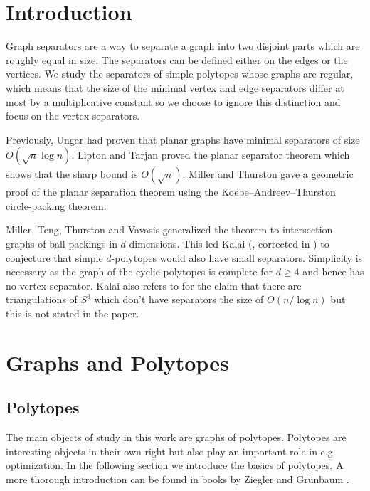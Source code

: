 \chapter{Introduction}
\label{intro}

Graph separators are a way to separate a graph into two disjoint parts which 
are roughly equal in size. The separators can be defined either on the edges or 
the vertices. We study the separators of simple polytopes whose graphs are 
regular, which means that the size of the minimal vertex and edge separators 
differ at most by a multiplicative constant so we choose to ignore this 
distinction and focus on the vertex separators. 

Previously, Ungar \cite{Ungar1951} had proven that planar graphs have minimal 
separators of size $O(\sqrt{n} \log n)$. Lipton and Tarjan proved the planar 
separator theorem  \cite{LiTa} which shows that the sharp bound is 
$O(\sqrt{n})$. Miller and Thurston \cite{MillerThurston-separators} gave a 
geometric proof of the planar separation theorem using the  
Koebe–Andreev–Thurston circle-packing theorem.

Miller, Teng, Thurston and Vavasis \cite{MillerTengThurstonVavasis} generalized 
the theorem to intersection graphs of ball packings in $d$ dimensions. This 
led Kalai (\cite{Kal07}, corrected in \cite{kalai04:_polyt}) to conjecture that 
simple $d$-polytopes would also have small separators.
Simplicity is necessary as the graph of the cyclic polytopes is complete for 
$d\geq 4$ and hence has no vertex separator. Kalai also refers to 
\cite{MillerTengThurstonVavasis} for the claim that there are triangulations of 
$S^3$ which don't have separators the size of $O(n/\log n)$ but this is not 
stated in the paper.

\chapter{Graphs and Polytopes}
\label{mathchapter}

\section{Polytopes}

The main objects of study in this work are graphs of polytopes. Polytopes are 
interesting 
objects in their own right but also play an important role in e.g. 
optimization. In the following section we introduce the basics of polytopes. 
A more thorough introduction can be found in books by Ziegler \cite{PolyLec} 
and Gr\"unbaum \cite{Grunbaum69convexpolytopes}. 

